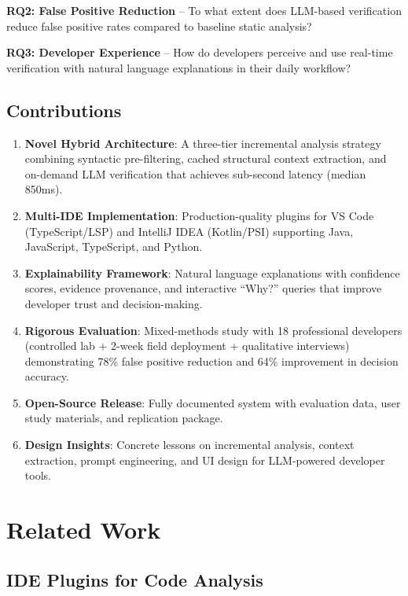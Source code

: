 \documentclass[conference]{IEEEtran}
\begin{document}
\textbf{RQ2: False Positive Reduction} -- To what extent does LLM-based verification reduce false positive rates compared to baseline static analysis?

\textbf{RQ3: Developer Experience} -- How do developers perceive and use real-time verification with natural language explanations in their daily workflow?

\subsection{Contributions}

\begin{enumerate}
\item \textbf{Novel Hybrid Architecture}: A three-tier incremental analysis strategy combining syntactic pre-filtering, cached structural context extraction, and on-demand LLM verification that achieves sub-second latency (median 850ms).

\item \textbf{Multi-IDE Implementation}: Production-quality plugins for VS Code (TypeScript/LSP) and IntelliJ IDEA (Kotlin/PSI) supporting Java, JavaScript, TypeScript, and Python.

\item \textbf{Explainability Framework}: Natural language explanations with confidence scores, evidence provenance, and interactive ``Why?'' queries that improve developer trust and decision-making.

\item \textbf{Rigorous Evaluation}: Mixed-methods study with 18 professional developers (controlled lab + 2-week field deployment + qualitative interviews) demonstrating 78\% false positive reduction and 64\% improvement in decision accuracy.

\item \textbf{Open-Source Release}: Fully documented system with evaluation data, user study materials, and replication package.

\item \textbf{Design Insights}: Concrete lessons on incremental analysis, context extraction, prompt engineering, and UI design for LLM-powered developer tools.
\end{enumerate}

\section{Related Work}

\subsection{IDE Plugins for Code Analysis}
\end{document}
